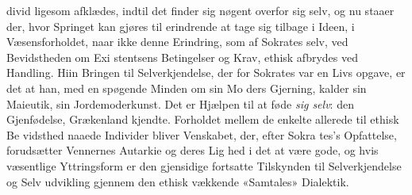 \documentclass[12pt,a4paper]{book}
\begin{document}
divid ligesom afklædes, indtil det finder sig nøgent overfor sig
selv, og nu staaer der, hvor Springet kan gjøres til erindrende
at tage sig tilbage i Ideen, i Væsensforholdet, naar ikke denne
Erindring, som af Sokrates selv, ved Bevidstheden om Exi\-%
stentsens Betingelser og Krav, ethisk afbrydes ved Handling.
Hiin Bringen til Selverkjendelse, der for Sokrates var en Livs\-%
opgave, er det at han, med en spøgende Minden om sin Mo\-%
ders Gjerning, kalder sin Maieutik, sin Jordemoderkunst. Det
er Hjælpen til at føde \emph{sig selv}: den Gjenfødelse, Grækenland
kjendte. Forholdet mellem de enkelte allerede til ethisk Be\-%
vidsthed naaede Individer bliver Venskabet, der, efter Sokra\-%
tes's Opfattelse, forudsætter Vennernes Autarkie og deres Lig\-%
hed i det at være gode, og hvis væsentlige Yttringsform er
den gjensidige fortsatte Tilskynden til Selverkjendelse og Selv\-%
udvikling gjennem den ethisk vækkende «Samtales» Dialektik.
\end{document}
